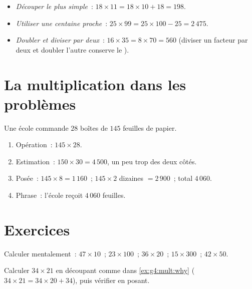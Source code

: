\begin{example}\label{ex:g4:mult:tricks}
\begin{itemize}
  \item \emph{Découper le plus simple}~: $18 \times 11 = 18 \times 10
        + 18 = 198$.
  \item \emph{Utiliser une centaine proche}~: $25 \times 99 = 25 \times 100 -
        25 = 2\,475$.
  \item \emph{Doubler et diviser par deux}~: $16 \times 35 = 8 \times 70 =
        560$ (diviser un facteur par deux et doubler l'autre
        conserve le ).
\end{itemize}
\end{example}

\section{La multiplication dans les problèmes}

\begin{example}\label{ex:g4:mult:problem}
Une école commande $28$ boîtes de $145$ feuilles de papier.
\begin{enumerate}
  \item Opération~: $145 \times 28$.
  \item Estimation~: $150 \times 30 = 4\,500$, un peu trop des deux
        côtés.
  \item Posée~: $145 \times 8 = 1\,160$~; $145 \times 2$ dizaines
        $= 2\,900$~; total $4\,060$.
  \item Phrase~: l'école reçoit $4\,060$ feuilles.
\end{enumerate}
\end{example}

\section{Exercices}

\begin{exercise}[$\star$]\label{exo:g4:mult:1}
Calculer mentalement~: $47 \times 10$~; \quad $23 \times 100$~; \quad
$36 \times 20$~; \quad $15 \times 300$~; \quad $42 \times 50$.
\end{exercise}

\begin{exercise}[$\star$]\label{exo:g4:mult:2}
Calculer $34 \times 21$ en découpant comme dans
\cref{ex:g4:mult:why} ($34 \times 21 = 34 \times 20 + 34$), puis
vérifier en posant.
\end{exercise}

